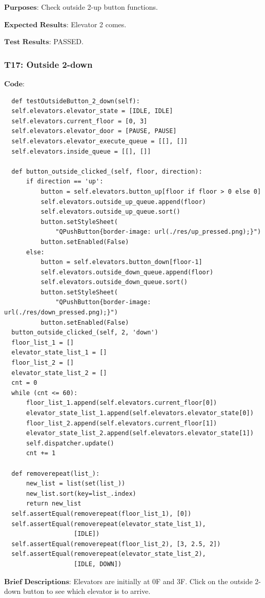 \documentclass{article}
\begin{document}
$\textbf{Purposes:}$
Check outside 2-up button functions.

$\textbf{Expected Results:}$
Elevator 2 comes.

$\textbf{Test Results:}$
PASSED.

\subsubsection*{T17: Outside 2-down}
$\textbf{Code:}$
\begin{lstlisting}
  def testOutsideButton_2_down(self):
  self.elevators.elevator_state = [IDLE, IDLE]
  self.elevators.current_floor = [0, 3]
  self.elevators.elevator_door = [PAUSE, PAUSE]
  self.elevators.elevator_execute_queue = [[], []]
  self.elevators.inside_queue = [[], []]

  def button_outside_clicked_(self, floor, direction):
      if direction == 'up':
          button = self.elevators.button_up[floor if floor > 0 else 0]
          self.elevators.outside_up_queue.append(floor)
          self.elevators.outside_up_queue.sort()
          button.setStyleSheet(
              "QPushButton{border-image: url(./res/up_pressed.png);}")
          button.setEnabled(False)
      else:
          button = self.elevators.button_down[floor-1]
          self.elevators.outside_down_queue.append(floor)
          self.elevators.outside_down_queue.sort()
          button.setStyleSheet(
              "QPushButton{border-image: url(./res/down_pressed.png);}")
          button.setEnabled(False)
  button_outside_clicked_(self, 2, 'down')
  floor_list_1 = []
  elevator_state_list_1 = []
  floor_list_2 = []
  elevator_state_list_2 = []
  cnt = 0
  while (cnt <= 60):
      floor_list_1.append(self.elevators.current_floor[0])
      elevator_state_list_1.append(self.elevators.elevator_state[0])
      floor_list_2.append(self.elevators.current_floor[1])
      elevator_state_list_2.append(self.elevators.elevator_state[1])
      self.dispatcher.update()
      cnt += 1

  def removerepeat(list_):
      new_list = list(set(list_))
      new_list.sort(key=list_.index)
      return new_list
  self.assertEqual(removerepeat(floor_list_1), [0])
  self.assertEqual(removerepeat(elevator_state_list_1),
                   [IDLE])
  self.assertEqual(removerepeat(floor_list_2), [3, 2.5, 2])
  self.assertEqual(removerepeat(elevator_state_list_2),
                   [IDLE, DOWN])
\end{lstlisting}

$\textbf{Brief Descriptions:}$
Elevators are initially at 0F and 3F. Click on the outside 2-down button to see which elevator is to arrive.
\end{document}
